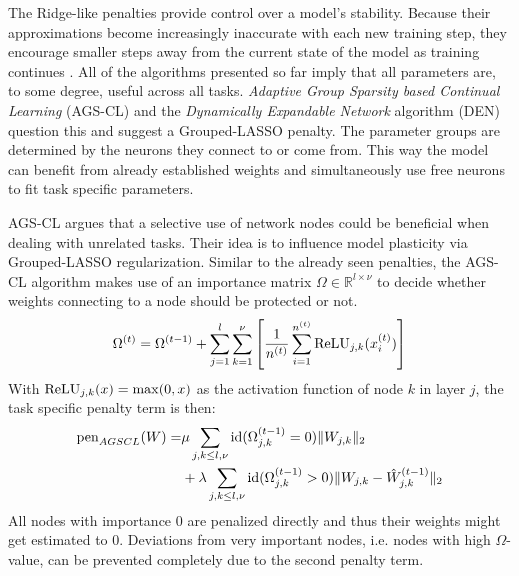 The Ridge-like penalties provide control over a model's stability. Because their approximations become increasingly inaccurate with each new training step, they encourage smaller steps away from the current state of the model as training continues \cite{yin2021optimizationgeneralizationregularizationbasedcontinual}. All of the algorithms presented so far imply that all parameters are, to some degree, useful across all tasks. \textit{Adaptive Group Sparsity based Continual Learning} (AGS-CL) \cite{jung2021continuallearningnodeimportancebased} and the \textit{Dynamically Expandable Network} algorithm (DEN) \cite{yoon2018lifelonglearningdynamicallyexpandable} question this and suggest a Grouped-LASSO penalty. The parameter groups are determined by the neurons they connect to or come from. This way the model can benefit from already established weights and simultaneously use free neurons to fit task specific parameters.

AGS-CL argues that a selective use of network nodes could be beneficial when dealing with unrelated tasks. Their idea is to influence model plasticity via Grouped-LASSO regularization. Similar to the already seen penalties, the AGS-CL algorithm makes use of an importance matrix $\Omega\in\mathbb{R}^{l\times \nu}$ to decide whether weights connecting to a node should be protected or not.
\begin{equation}
	\Omega^{(t)} = \Omega^{(t-1)} + \sum_{j=1}^{l}\sum_{k=1}^{\nu} \left[\frac{1}{n^{(t)}}\sum_{i=1}^{n^{(t)}}\operatorname{ReLU}_{j,k}(x_i^{(t)})\right]
\end{equation}
With $\operatorname{ReLU}_{j,k}(x) = \max(0, x)$ as the activation function of node $k$ in layer $j$, the task specific penalty term is then:
\begin{equation}\label{agscl}
	\begin{split}
		\operatorname{pen}_{AGSCL}(W)= &\mu\sum_{j,k \leq l,\nu} \operatorname{id}(\Omega_{j,k}^{(t-1)} = 0)\lVert W_{j,k} \rVert_2 \\
		&+ \lambda \sum_{j,k \leq l,\nu} \operatorname{id}(\Omega_{j,k}^{(t-1)} > 0)\lVert W_{j,k} - \hat{W}_{j,k}^{(t-1)}\rVert_2
	\end{split}
\end{equation}
All nodes with importance 0 are penalized directly and thus their weights might get estimated to 0. Deviations from very important nodes, i.e. nodes with high $\Omega$-value, can be prevented completely due to the second penalty term.

